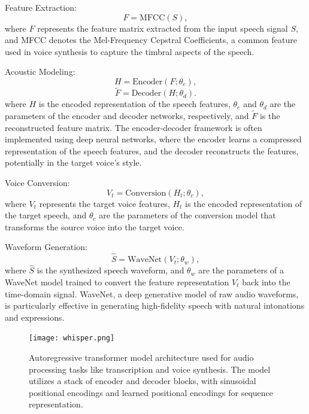 \documentclass[11pt,a4paper,oneside]{report}
\begin{document}
Feature Extraction:
\begin{equation}
F = \text{MFCC}(S),
\end{equation}
where $F$ represents the feature matrix extracted from the input speech signal $S$, and MFCC denotes the Mel-Frequency Cepstral Coefficients, a common feature used in voice synthesis to capture the timbral aspects of the speech.

Acoustic Modeling:
\begin{equation}
H = \text{Encoder}(F; \theta_e),
\end{equation}
\begin{equation}
\tilde{F} = \text{Decoder}(H; \theta_d).
\end{equation}
where $H$ is the encoded representation of the speech features, $\theta_e$ and $\theta_d$ are the parameters of the encoder and decoder networks, respectively, and $\tilde{F}$ is the reconstructed feature matrix. The encoder-decoder framework is often implemented using deep neural networks, where the encoder learns a compressed representation of the speech features, and the decoder reconstructs the features, potentially in the target voice's style.

Voice Conversion:
\begin{equation}
V_t = \text{Conversion}(H_t; \theta_c),
\end{equation}
where $V_t$ represents the target voice features, $H_t$ is the encoded representation of the target speech, and $\theta_c$ are the parameters of the conversion model that transforms the source voice into the target voice.

Waveform Generation:
\begin{equation}
\hat{S} = \text{WaveNet}(V_t; \theta_w),
\end{equation}
where $\hat{S}$ is the synthesized speech waveform, and $\theta_w$ are the parameters of a WaveNet \cite{oord2016wavenet} model trained to convert the feature representation $V_t$ back into the time-domain signal. WaveNet, a deep generative model of raw audio waveforms, is particularly effective in generating high-fidelity speech with natural intonations and expressions.

\begin{figure}[htbp]
  \centering
  \texttt{[image: whisper.png]}
  \caption{Autoregressive transformer model architecture used for audio processing tasks like transcription and voice synthesis. The model utilizes a stack of encoder and decoder blocks, with sinusoidal positional encodings and learned positional encodings for sequence representation. \cite{OpenAIWhisper}}
\end{figure}
\end{document}
